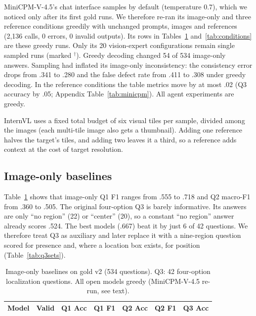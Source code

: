 \documentclass[11pt]{article}
\begin{document}
MiniCPM-V-4.5's chat interface samples by default (temperature 0.7), which we noticed only after its first gold runs. We therefore re-ran its image-only and three reference conditions greedily with unchanged prompts, images and references (2,136 calls, 0 errors, 0 invalid outputs). Its rows in Tables~\ref{tab:baseline} and~\ref{tab:conditions} are these greedy runs. Only its 20 vision-expert configurations remain single sampled runs (marked $^\dagger$). Greedy decoding changed 54 of 534 image-only answers. Sampling had inflated its image-only inconsistency: the consistency error drops from .341 to .280 and the false defect rate from .411 to .308 under greedy decoding. In the reference conditions the table metrics move by at most .02 (Q3 accuracy by .05; Appendix Table~\ref{tab:minicpm}). All agent experiments are greedy.

InternVL uses a fixed total budget of six visual tiles per sample, divided among the images (each multi-tile image also gets a thumbnail). Adding one reference halves the target's tiles, and adding two leaves it a third, so a reference adds context at the cost of target resolution.

\subsection{Image-only baselines}
Table~\ref{tab:baseline} shows that image-only Q1 F1 ranges from .555 to .718 and Q2 macro-F1 from .360 to .505. The original four-option Q3 is barely informative. Its answers are only ``no region'' (22) or ``center'' (20), so a constant ``no region'' answer already scores .524. The best models (.667) beat it by just 6 of 42 questions. We therefore treat Q3 as auxiliary and later replace it with a nine-region question scored for presence and, where a location box exists, for position (Table~\ref{tab:q3sets}).

\begin{table}[t]
\centering
\caption{Image-only baselines on gold v2 (534 questions). Q3: 42 four-option localization questions. All open models greedy (MiniCPM-V-4.5 re-run, see text).}
\label{tab:baseline}
\begin{tabular}{lrrrrrr}
\toprule
Model & Valid & Q1 Acc & Q1 F1 & Q2 Acc & Q2 F1 & Q3 Acc \\
\midrule

\bottomrule
\end{tabular}
\end{table}
\end{document}

